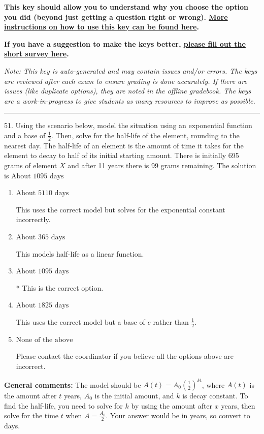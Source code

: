 \documentclass{extbook}[14pt]
\begin{document}
\textbf{This key should allow you to understand why you choose the option you did (beyond just getting a question right or wrong). \href{https://xronos.clas.ufl.edu/mac1105spring2020/courseDescriptionAndMisc/Exams/LearningFromResults}{More instructions on how to use this key can be found here}.}

\textbf{If you have a suggestion to make the keys better, \href{https://forms.gle/CZkbZmPbC9XALEE88}{please fill out the short survey here}.}

\textit{Note: This key is auto-generated and may contain issues and/or errors. The keys are reviewed after each exam to ensure grading is done accurately. If there are issues (like duplicate options), they are noted in the offline gradebook. The keys are a work-in-progress to give students as many resources to improve as possible.}

\rule{\textwidth}{0.4pt}

51. Using the scenario below, model the situation using an exponential function and a base of $\frac{1}{2}$. Then, solve for the half-life of the element, rounding to the nearest day.
The half-life of an element is the amount of time it takes for the element to decay to half of its initial starting amount. There is initially 695 grams of element $X$ and after 11 years there is 99 grams remaining. 
The solution is $ \text{About } 1095 \text{ days} $ 

\begin{enumerate}[label=\Alph*.] 
\item $ \text{About } 5110 \text{ days} $ 

 This uses the correct model but solves for the exponential constant incorrectly. 
\item $ \text{About } 365 \text{ days} $ 

 This models half-life as a linear function. 
\item $ \text{About } 1095 \text{ days} $ 

 * This is the correct option. 
\item $ \text{About } 1825 \text{ days} $ 

 This uses the correct model but a base of $e$ rather than $\frac{1}{2}$. 
\item $ \text{None of the above} $ 

 Please contact the coordinator if you believe all the options above are incorrect. 
\end{enumerate} 
 
\textbf{General comments:} The model should be $A(t) = A_0 (\frac{1}{2})^{kt}$, where $A(t)$ is the amount after $t$ years, $A_0$ is the initial amount, and $k$ is decay constant. To find the half-life, you need to solve for $k$ by using the amount after $x$ years, then solve for the time $t$ when $A = \frac{A_0}{2}$. Your answer would be in years, so convert to days.
\end{document}
